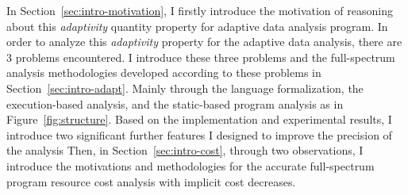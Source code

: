 In Section~\ref{sec:intro-motivation},
I firstly introduce the motivation of reasoning about this \emph{adaptivity} quantity property 
for adaptive data analysis program.
In order to analyze this \emph{adaptivity} property for the adaptive data analysis, there are 3 problems encountered.
I introduce these three problems
and the full-spectrum analysis methodologies developed according to these problems in Section~\ref{sec:intro-adapt}.
Mainly through the language formalization,
the execution-based analysis, and the static-based program analysis as in Figure~\ref{fig:structure}.
%
Based on the implementation and experimental results, I introduce two significant 
further features I designed to improve the precision of the analysis 
%
 Then, in Section~\ref{sec:intro-cost}, through two observations, I introduce the motivations and methodologies
 for the accurate full-spectrum program resource cost analysis with implicit cost decreases.
